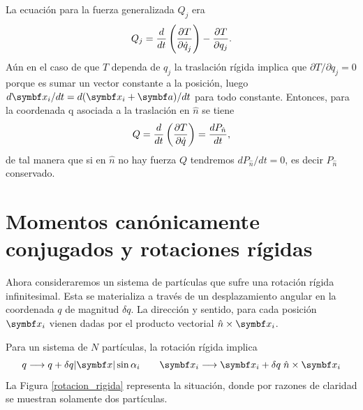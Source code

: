 \documentclass[10pt,oneside]{CBFT_book}
\begin{document}
La ecuación para la fuerza generalizada $Q_j$ era
\[
	Q_j = \frac{d}{dt}\left( \frac{\partial^{\hspace{-0.05em}} {T}}{\partial {\dot{q}_j}^{\hspace{-0.05em}}} \right) - \frac{\partial^{\hspace{-0.05em}} {T}}{\partial {q_j}^{\hspace{-0.05em}}}.
\]
Aún en el caso de que $T$ dependa de $q_j$ la traslación rígida implica que 
$ \partial{T}/\partial{q_j} = 0 $ 
porque es sumar un vector constante a la posición, luego $ d\vb{x}_i/dt = d(\vb{x}_i + \vb{a}) /dt$
para todo  constante. Entonces, para la coordenada q asociada a la traslación en $\hat{n}$
se tiene 
\[
	Q = \frac{d}{dt}\left( \frac{\partial^{\hspace{-0.05em}} {T}}{\partial {\dot{q}}^{\hspace{-0.05em}}} \right) = \frac{d^{\hspace{-0.05em}} {P_{\hat{n}}}}{d {t}^{\hspace{-0.05em}}},
\]
de tal manera que si en $\hat{n}$ no hay fuerza $Q$ tendremos $ d P_{\hat{n}}/dt = 0 $, es decir 
$ P_{\hat{n}} $ conservado.



\section{Momentos canónicamente conjugados y rotaciones rígidas}

Ahora consideraremos un sistema de partículas que sufre una rotación rígida infinitesimal.
Esta se materializa a través de un desplazamiento angular en la coordenada $ q $ de magnitud $\delta q$.
La dirección y sentido, para cada posición $ \vb{x}_i $ vienen dadas por el producto vectorial 
$ \hat{n} \times \vb{x}_i$.

Para un sistema de $ N $ partículas, la rotación rígida implica
\[
	q \longrightarrow q + \delta q |\vb{x}| \sin \alpha_i \qquad
	\vb{x}_i \longrightarrow \vb{x}_i + \delta q \; \hat{n} \times \vb{x}_i
\]
La Figura \ref{rotacion_rigida} representa la situación, donde por razones de claridad se muestran
solamente dos partículas.
\end{document}
